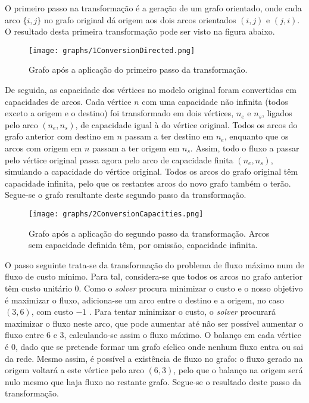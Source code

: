 \documentclass[12pt, a4paper, titlepage]{article}
\begin{document}
O primeiro passo na transformação é a geração de um grafo orientado, onde cada arco $\{i, j\}$ no
grafo original dá origem aos dois arcos orientados $(i, j)$ e $(j, i)$. O resultado desta primeira
transformação pode ser visto na figura abaixo.

\begin{figure}[H]
    \centering
    \texttt{[image: graphs/1ConversionDirected.png]}
    \caption{Grafo após a aplicação do primeiro passo da transformação.}
    \label{1conversion-graph}
\end{figure}

De seguida, as capacidade dos vértices no modelo original foram convertidas em capacidades de arcos.
Cada vértice $n$ com uma capacidade não infinita (todos exceto a origem e o destino) foi
transformado em dois vértices, $n_e$ e $n_s$, ligados pelo arco $(n_e, n_s)$, de capacidade igual à
do vértice original. Todos os arcos do grafo anterior com destino em $n$ passam a ter destino em
$n_e$, enquanto que os arcos com origem em $n$ passam a ter origem em $n_s$. Assim, todo o fluxo a
passar pelo vértice original passa agora pelo arco de capacidade finita $(n_e, n_s)$, simulando a
capacidade do vértice original. Todos os arcos do grafo original têm capacidade infinita, pelo que
os restantes arcos do novo grafo também o terão. Segue-se o grafo resultante deste segundo passo da
transformação.

\begin{figure}[H]
    \centering
    \texttt{[image: graphs/2ConversionCapacities.png]}
    \caption{Grafo após a aplicação do segundo passo da transformação. Arcos sem capacidade
        definida têm, por omissão, capacidade infinita.}
    \label{2conversion-graph}
\end{figure}

O passo seguinte trata-se da transformação do problema de fluxo máximo num de fluxo de custo mínimo.
Para tal, considera-se que todos os arcos no grafo anterior têm custo unitário 0. Como o
\emph{solver} procura minimizar o custo e o nosso objetivo é maximizar o fluxo, adiciona-se um arco
entre o destino e a origem, no caso $(3, 6)$, com custo $-1$ \cite{book}. Para tentar minimizar o
custo, o \emph{solver} procurará maximizar o fluxo neste arco, que pode aumentar até não ser
possível aumentar o fluxo entre 6 e 3, calculando-se assim o fluxo máximo. O balanço em cada vértice
é 0, dado que se pretende formar um grafo cíclico onde nenhum fluxo entra ou sai da rede. Mesmo
assim, é possível a existência de fluxo no grafo: o fluxo gerado na origem voltará a este vértice
pelo arco $(6, 3)$, pelo que o balanço na origem será nulo mesmo que haja fluxo no restante grafo.
Segue-se o resultado deste passo da transformação.
\end{document}
